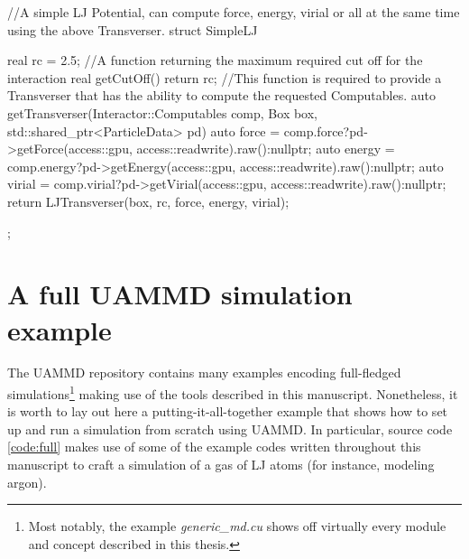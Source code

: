 \documentclass[twoside,openright,titlepage,numbers=noenddot,%
headinclude,footinclude,cleardoublepage=empty,abstract=on,
BCOR=5mm,fontsize=11pt, dvipsnames, paper=b5
]{scrreprt}
\begin{document}
\begin{code2}
//A simple LJ Potential, can compute force, energy, virial or all at the same time using the above Transverser.
struct SimpleLJ{
  real rc = 2.5;
  //A function returning the maximum required cut off for the interaction
  real getCutOff(){
    return rc;
  }
  //This function is required to provide a Transverser that has the ability to compute the requested Computables.
  auto getTransverser(Interactor::Computables comp,
  Box box,
  std::shared_ptr<ParticleData> pd){
    auto force = comp.force?pd->getForce(access::gpu, access::readwrite).raw():nullptr;
    auto energy = comp.energy?pd->getEnergy(access::gpu, access::readwrite).raw():nullptr;
    auto virial = comp.virial?pd->getVirial(access::gpu, access::readwrite).raw():nullptr;
    return LJTransverser(box, rc, force, energy, virial);
  }
  
};
\end{code2}




\chapter{A full UAMMD simulation example}\label{ch:fullexample}
   
The UAMMD repository contains many examples encoding full-fledged simulations\footnote{Most notably, the example \emph{generic\_md.cu} shows off virtually every module and concept described in this thesis.} making use of the tools described in this manuscript. Nonetheless, it is worth to lay out here a putting-it-all-together example that shows how to set up and run a simulation from scratch using UAMMD. In particular, source code \ref{code:full} makes use of some of the example codes written throughout this manuscript to craft a simulation of a gas of \gls{LJ} atoms (for instance, modeling argon).
\end{document}

